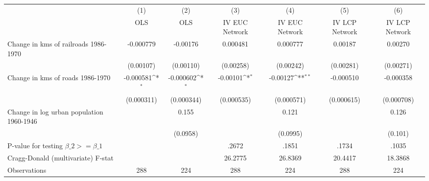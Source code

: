 {
\def\sym#1{\ifmmode^{#1}\else\(^{#1}\)\fi}
\begin{tabular}{l*{6}{c}}
\hline\hline
                &\multicolumn{1}{c}{(1)}&\multicolumn{1}{c}{(2)}&\multicolumn{1}{c}{(3)}&\multicolumn{1}{c}{(4)}&\multicolumn{1}{c}{(5)}&\multicolumn{1}{c}{(6)}\\
                &\multicolumn{1}{c}{OLS}&\multicolumn{1}{c}{OLS}&\multicolumn{1}{c}{IV EUC Network}&\multicolumn{1}{c}{IV EUC Network}&\multicolumn{1}{c}{IV LCP Network}&\multicolumn{1}{c}{IV LCP Network}\\
\hline
Change in kms of railroads 1986-1970&-0.000779         & -0.00176         & 0.000481         & 0.000777         &  0.00187         &  0.00270         \\
                &(0.00107)         &(0.00110)         &(0.00258)         &(0.00242)         &(0.00281)         &(0.00271)         \\
[1em]
Change in kms of roads 1986-1970&-0.000581\sym{*}  &-0.000602\sym{*}  & -0.00101\sym{*}  & -0.00127\sym{**} &-0.000510         &-0.000358         \\
                &(0.000311)         &(0.000344)         &(0.000535)         &(0.000571)         &(0.000615)         &(0.000708)         \\
[1em]
Change in log urban population 1960-1946&                  &    0.155         &                  &    0.121         &                  &    0.126         \\
                &                  & (0.0958)         &                  & (0.0995)         &                  &  (0.101)         \\
\hline
P-value for testing $\beta\_{2} >= \beta\_{1}$&                  &                  &    .2672         &    .1851         &    .1734         &    .1035         \\
Cragg-Donald (multivariate) F-stat&                  &                  &  26.2775         &  26.8369         &  20.4417         &  18.3868         \\
Observations    &      288         &      224         &      288         &      224         &      288         &      224         \\
\hline\hline
\end{tabular}
}
